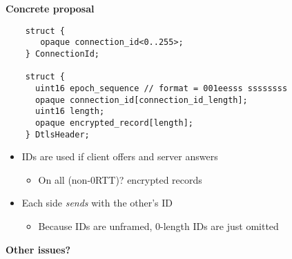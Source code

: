 \documentclass[helvetica]{seminar}
\newcommand{\heading}[1]{%
  \begin{center} 
    \large\bf 
    #1 
  \end{center} 
  \vspace{.4 in}}
\begin{document}
\begin{slide}
  \heading{Concrete proposal}
  
{\footnotesize
\begin{verbatim}
    struct {
       opaque connection_id<0..255>;
    } ConnectionId;

    struct {
      uint16 epoch_sequence // format = 001eesss ssssssss
      opaque connection_id[connection_id_length];
      uint16 length;
      opaque encrypted_record[length];
    } DtlsHeader;
\end{verbatim}
}

\begin{itemize}
\item IDs are used if client offers and server answers
  \begin{itemize}
    \item On all (non-0RTT)? encrypted records
  \end{itemize}
\item Each side \emph{sends} with the other's ID
  \begin{itemize}
    \item Because IDs are unframed, 0-length IDs are just omitted
  \end{itemize}
\end{itemize}
\end{slide}

\begin{slide}
\heading{Other issues?}

\end{slide}
\end{document}
